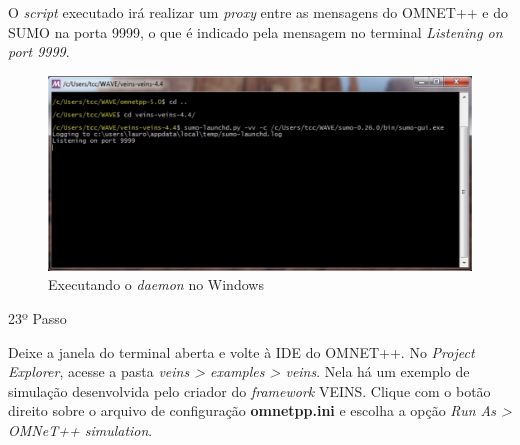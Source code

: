 \documentclass[
12pt,				%
openright,			%
oneside,			%
a4paper,			%
brazil,				%
]{abntex2}
\begin{document}
{\begin{anexosenv}
                \par O \textit{script} executado irá realizar um \textit{proxy} entre as mensagens do OMNET++ e do SUMO na porta 9999, o que é indicado pela mensagem no terminal \textit{Listening on port 9999}.
		            
                \begin{figure} [H]
	                \centering
	                \includegraphics[scale=.28]{figuras/aneB/64DaemonWindows}
	                \caption{\label{fig_64}Executando o \textit{daemon} no Windows}
                \end{figure}
                    
                
            	\begin{description}
	                \item[23º Passo]
	            \end{description}
	            \par Deixe a janela do terminal aberta e volte à IDE do OMNET++. No \textit{Project Explorer}, acesse a pasta \textit{veins > examples > veins}. Nela há um exemplo de simulação desenvolvida pelo criador do \textit{framework} VEINS. Clique com o botão direito sobre o arquivo de configuração \textbf{omnetpp.ini} e escolha a opção \textit{Run As > OMNeT++ simulation}.
		            

\end{anexosenv}}
\end{document}
